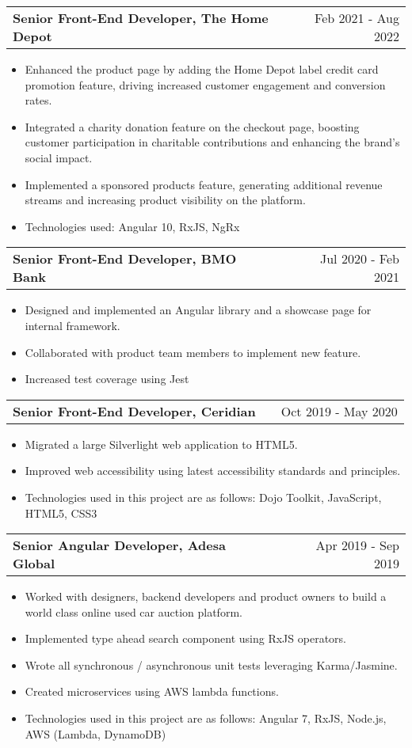\documentclass[a4paper,12pt]{article}
\makeatletter
\newenvironment{joblong}[2]
    {
    \begin{tabularx}{\linewidth}{@{}l X r@{}}
    \textbf{#1} & \hfill &  #2 \\[3.75pt]
    \end{tabularx}
    \begin{minipage}[t]{\linewidth}
    \begin{itemize}[nosep,after=\strut, leftmargin=1em, itemsep=3pt,label=--]
    }
    {
    \end{itemize}
    \end{minipage}    
    }
\makeatother
\begin{document}
\begin{joblong}{Senior Front-End Developer, The Home Depot}{Feb 2021 - Aug 2022}
\item Enhanced the product page by adding the Home Depot label credit card promotion feature, driving increased customer engagement and conversion rates.
\item Integrated a charity donation feature on the checkout page, boosting customer participation in charitable contributions and enhancing the brand's social impact. 
\item Implemented a sponsored products feature, generating additional revenue streams and increasing product visibility on the platform.
\item Technologies used:  Angular 10, RxJS, NgRx
\end{joblong}

\begin{joblong}{Senior Front-End Developer, BMO Bank}{Jul 2020 - Feb 2021}
\item Designed and implemented an Angular library and a showcase page for internal framework.
\item Collaborated with product team members to implement new feature.
\item Increased test coverage using Jest
\end{joblong}

\begin{joblong}{Senior Front-End Developer, Ceridian}{Oct 2019 - May 2020}
\item Migrated a large Silverlight web application to HTML5.
\item Improved web accessibility using latest accessibility standards and principles. 
\item Technologies used in this project are as follows:  Dojo Toolkit, JavaScript, HTML5, CSS3
\end{joblong}

\begin{joblong}{Senior Angular Developer, Adesa Global}{Apr 2019 - Sep 2019}
\item Worked with designers, backend developers and product owners to build a world class online used car auction platform.
\item Implemented type ahead search component using RxJS operators. 
\item Wrote all synchronous / asynchronous unit tests leveraging Karma/Jasmine.
\item Created microservices using AWS lambda functions.
\item Technologies used in this project are as follows:  Angular 7, RxJS, Node.js, AWS (Lambda, DynamoDB)
\end{joblong}
\end{document}
